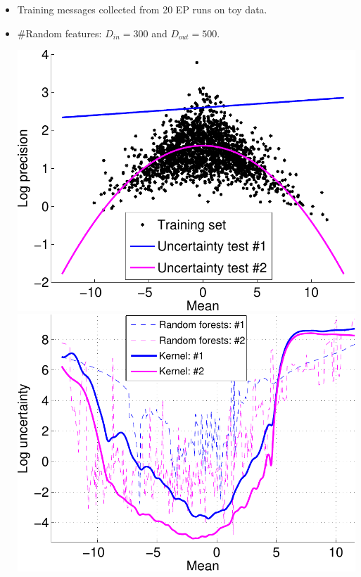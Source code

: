 \documentclass[25pt, a0paper, portrait, margin=0mm, innermargin=10mm,
     blockverticalspace=7mm, colspace=7mm, subcolspace=8mm]{tikzposter} %
\newcommand{\factor}{f}				%
\newcommand{\msg}[2]{m_{#1 \rightarrow #2}}			%
\begin{document}
\begin{columns}
{\vspace{10mm}

\begin{itemize}

\item Training messages collected from 20 EP runs on toy data.  
\item \#Random features: $D_{in} = 300$ and  $D_{out} = 500$.

\begin{tikzfigure}
  \hspace{-10cm}
  \includegraphics[width=13cm]{uncertainty/logistic_uncertainty_test-crop}
  \hspace{1cm}
      \includegraphics[width=13cm]{uncertainty/logistic_uncertainty_all-crop}


\end{tikzfigure}
\end{itemize}}
\end{columns}
\end{document}
